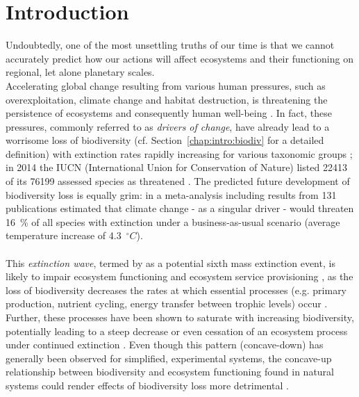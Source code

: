 \chapter{Introduction}
\label{chap:intro}
Undoubtedly, one of the most unsettling truths of our time is that we cannot accurately predict how our actions will affect ecosystems and their functioning on regional, let alone planetary scales.\\
Accelerating global change resulting from various human pressures, such as overexploitation, climate change and habitat destruction, is threatening the persistence of ecosystems and consequently human well-being \citep{MEA2005}. In fact, these pressures, commonly referred to as \emph{drivers of change}, have already lead to a worrisome loss of biodiversity (cf. Section~\ref{chap:intro:biodiv} for a detailed definition)
with extinction rates rapidly increasing for various taxonomic groups \citep{Dirzo2003,Wake2008}; in 2014 the IUCN (International Union for Conservation of Nature) listed 22413 of its 76199 assessed species as threatened \citep{IUCN2014}. The predicted future development of biodiversity loss is equally grim: in a meta-analysis including results from 131 publications \cite{Urban2015} estimated that climate change - as a singular driver - would threaten 16~\% of all species with extinction under a business-as-usual scenario (average temperature increase of 4.3~$^{\circ}C$). 
\\\\
 This \emph{extinction wave}, termed by \cite{Barnosky2011} as a potential sixth mass extinction event, is likely to impair ecosystem functioning and ecosystem service provisioning \citep{MEA2005}, as
the loss of  biodiversity decreases the rates at which essential processes (e.g. primary production, nutrient cycling, energy transfer between trophic levels) occur \citep[][]{Cardinale2012}. 
Further, these processes have been shown to saturate with increasing biodiversity, potentially leading to a steep decrease or even cessation of an ecosystem process under continued extinction \citep{Cardinale2012,Tilman2014}. Even though this pattern (concave-down) has generally been observed for simplified, experimental systems, the concave-up relationship between biodiversity and ecosystem functioning found in natural systems could render effects of biodiversity loss more detrimental \citep{Mora2014}. \\\\
